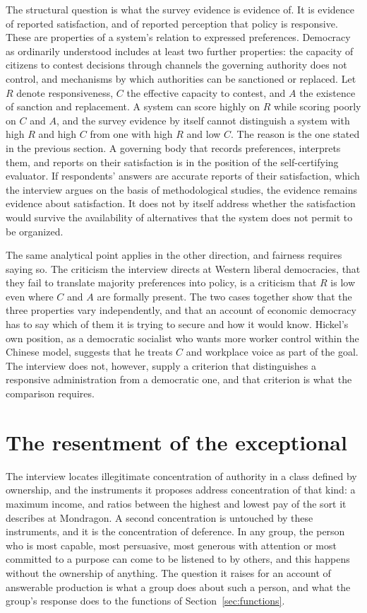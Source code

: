 \documentclass[12pt]{article}
\theoremstyle{definition}
\begin{document}
The structural question is what the survey evidence is evidence of. It is evidence of reported satisfaction, and of reported perception that policy is responsive. These are properties of a system's relation to expressed preferences. Democracy as ordinarily understood includes at least two further properties: the capacity of citizens to contest decisions through channels the governing authority does not control, and mechanisms by which authorities can be sanctioned or replaced. Let $R$ denote responsiveness, $C$ the effective capacity to contest, and $A$ the existence of sanction and replacement. A system can score highly on $R$ while scoring poorly on $C$ and $A$, and the survey evidence by itself cannot distinguish a system with high $R$ and high $C$ from one with high $R$ and low $C$. The reason is the one stated in the previous section. A governing body that records preferences, interprets them, and reports on their satisfaction is in the position of the self-certifying evaluator. If respondents' answers are accurate reports of their satisfaction, which the interview argues on the basis of methodological studies, the evidence remains evidence about satisfaction. It does not by itself address whether the satisfaction would survive the availability of alternatives that the system does not permit to be organized.

The same analytical point applies in the other direction, and fairness requires saying so. The criticism the interview directs at Western liberal democracies, that they fail to translate majority preferences into policy, is a criticism that $R$ is low even where $C$ and $A$ are formally present. The two cases together show that the three properties vary independently, and that an account of economic democracy has to say which of them it is trying to secure and how it would know. Hickel's own position, as a democratic socialist who wants more worker control within the Chinese model, suggests that he treats $C$ and workplace voice as part of the goal. The interview does not, however, supply a criterion that distinguishes a responsive administration from a democratic one, and that criterion is what the comparison requires.

\section{The resentment of the exceptional}\label{sec:exceptional}

The interview locates illegitimate concentration of authority in a class defined by ownership, and the instruments it proposes address concentration of that kind: a maximum income, and ratios between the highest and lowest pay of the sort it describes at Mondragon. A second concentration is untouched by these instruments, and it is the concentration of deference. In any group, the person who is most capable, most persuasive, most generous with attention or most committed to a purpose can come to be listened to by others, and this happens without the ownership of anything. The question it raises for an account of answerable production is what a group does about such a person, and what the group's response does to the functions of Section~\ref{sec:functions}.
\end{document}
